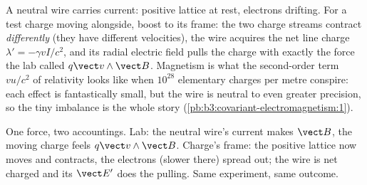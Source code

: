 \begin{example}\label{ex:b3:covariant-electromagnetism:wire}
A neutral wire carries current: positive lattice at rest, electrons
drifting. For a test charge moving alongside, boost to its frame: the
two charge streams contract \emph{differently} (they have different
velocities), the wire acquires the net line charge $\lambda' =
-\gamma vI/c^2$, and its radial electric field pulls the charge with
exactly the force the lab called $q\vect v\wedge\vect B$. Magnetism
is what the second-order term $v u/c^2$ of relativity looks like when
$10^{28}$ elementary charges per metre conspire: each effect is
fantastically small, but the wire is neutral to even greater
precision, so the tiny imbalance is the whole story
(\cref{pb:b3:covariant-electromagnetism:1}).
\end{example}

\begin{omfigure}

{\small One force, two accountings. Lab: the neutral wire's current
makes $\vect B$, the moving charge feels $q\vect v\wedge\vect B$.
Charge's frame: the positive lattice now moves and contracts, the
electrons (slower there) spread out; the wire is net charged and its
$\vect E'$ does the pulling. Same experiment, same outcome.}
\end{omfigure}

